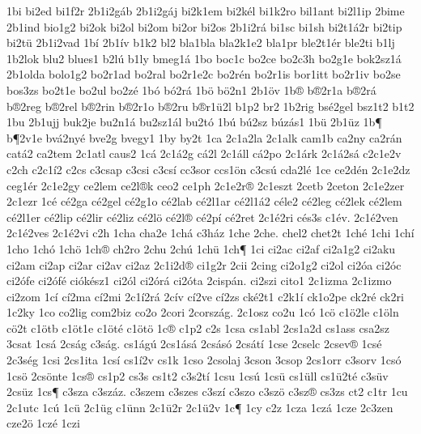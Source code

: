 {1bi
bi2ed
bi1f2r
2b1i2g^^e1b
2b1i2g^^e1j
bi2k1em
bi2k^^e9l
bi1k2ro
bil1ant
bi2l1ip
2bime
2b1ind
bio1g2
bi2ok
bi2ol
bi2om
bi2or
bi2os
2b1i2r^^e1
bi1sc
bi1sh
bi2t1^^e12r
bi2tip
bi2t^^fc
2b1i2vad
1b^^ed
2b1^^edv
b1k2
bl2
bla1bla
bla2k1e2
bla1pr
ble2t1^^e9r
ble2ti
b1lj
1b2lok
blu2
blues1
b2l^^fa
b1ly
bmeg1^^e1
1bo
boc1c
bo2ce
bo2c3h
bo2g1e
bok2sz1^^e1
2b1olda
bolo1g2
bo2r1ad
bo2ral
bo2r1e2c
bo2r^^e9n
bo2r1is
bor1itt
bo2r1iv
bo2se
bos3zs
bo2t1e
bo2ul
bo2z^^e9
1b^^f3
b^^f32r^^e1
1b^^f6
b^^f62n1
2b1^^f6v
1b^^ae
b^^ae2r1a
b^^ae2r^^e1
b^^ae2reg
b^^ae2rel
b^^ae2rin
b^^ae2r1o
b^^ae2ru
b^^aer1^^fc2l
b1p2
br2
1b2rig
bs^^e92gel
bsz1t2
b1t2
1bu
2b1ujj
buk2je
bu2n1^^e1
bu2sz1^^e1l
bu2t^^f3
1b^^fa
b^^fa2sz
b^^faz^^e1s1
1b^^fc
2b1^^fcz
1b^^b6
b^^b62v1e
bv^^e12ny^^e9
bve2g
bvegy1
1by
by2t
1ca
2c1a2la
2c1alk
cam1b
ca2ny
ca2r^^e1n
cat^^e12
ca2tem
2c1atl
caus2
1c^^e1
2c1^^e12g
c^^e12l
2c1^^e1ll
c^^e12po
2c1^^e1rk
2c1^^e12s^^e1
c2c1e2v
c2ch
c2c1^^ed2
c2cs
c3csap
c3csi
c3cs^^ed
cc3sor
ccs1^^f6n
c3cs^^fa
cda2l^^e9
1ce
ce2d^^e9n
2c1e2dz
ceg1^^e9r
2c1e2gy
ce2lem
ce2l^^aek
ceo2
ce1ph
2c1e2r^^ae
2c1eszt
2cetb
2ceton
2c1e2zer
2c1ezr
1c^^e9
c^^e92ga
c^^e92gel
c^^e92g1o
c^^e92lab
c^^e92l1ar
c^^e92l1^^e12
c^^e9le2
c^^e92leg
c^^e92lek
c^^e92lem
c^^e92l1er
c^^e92lip
c^^e92lir
c^^e92liz
c^^e92l^^f6
c^^e92l^^ae
c^^e92p^^ed
c^^e92ret
2c1^^e92ri
c^^e9s3s
c1^^e9v.
2c1^^e92ven
2c1^^e92ves
2c1^^e92vi
c2h
1cha
cha2e
1ch^^e1
c3h^^e1z
1che
2che.
chel2
chet2t
1ch^^e9
1chi
1ch^^ed
1cho
1ch^^f3
1ch^^f6
1ch^^ae
ch2ro
2chu
2ch^^fa
1ch^^fc
1ch^^b6
1ci
ci2ac
ci2af
ci2a1g2
ci2aku
ci2am
ci2ap
ci2ar
ci2av
ci2az
2c1i2d^^ae
ci1g2r
2cii
2cing
ci2o1g2
ci2ol
ci2^^f3a
ci2^^f3c
ci2^^f3fe
ci2^^f3f^^e9
ci^^f3k^^e9sz1
ci2^^f3l
ci2^^f3r^^e1
ci2^^f3ta
2cisp^^e1n.
ci2szi
cito1
2c1izma
2c1izmo
ci2zom
1c^^ed
c^^ed2ma
c^^ed2mi
2c1^^ed2r^^e1
2c^^edv
c^^ed2ve
c^^ed2zs
ck^^e92t1
c2k1^^ed
ck1o2pe
ck2r^^e9
ck2ri
1c2ky
1co
co2lig
com2biz
co2o
2cori
2corsz^^e1g.
2c1osz
co2u
1c^^f3
1c^^f6
c1^^f62le
c1^^f6ln
c^^f62t
c1^^f6tb
c1^^f6t1e
c1^^f6t^^e9
c1^^f6t^^f6
1c^^ae
c1p2
c2s
1csa
cs1abl
2cs1a2d
cs1ass
csa2sz
3csat
1cs^^e1
2cs^^e1g
c3s^^e1g.
cs1^^e1g^^fa
2cs1^^e1s^^e1
2cs^^e1s^^f3
2cs^^e1t^^ed
1cse
2cselc
2csev^^ae
1cs^^e9
2c3s^^e9g
1csi
2cs1ita
1cs^^ed
cs1^^ed2v
cs1k
1cso
2csolaj
3cson
3csop
2cs1orr
c3sorv
1cs^^f3
1cs^^f6
2cs^^f6nte
1cs^^ae
cs1p2
cs3s
cs1t2
c3s2t^^ed
1csu
1cs^^fa
1cs^^fc
cs1^^fcll
cs1^^fc2t^^e9
c3s^^fcv
2cs^^fcz
1cs^^b6
c3sza
c3sz^^e1z.
c3szem
c3szes
c3sz^^ed
c3szo
c3sz^^f6
c3sz^^ae
cs3zs
ct2
c1tr
1cu
2c1utc
1c^^fa
1c^^fc
2c1^^fcg
c1^^fcnn
2c1^^fc2r
2c1^^fc2v
1c^^b6
1cy
c2z
1cza
1cz^^e1
1cze
2c3zen
cze2^^f6
1cz^^e9
1czi
}

